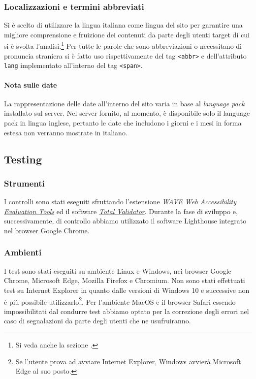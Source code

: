 \subsubsection{Localizzazioni e termini abbreviati} \label{lingue}
Si è scelto di utilizzare la lingua italiana come lingua del sito per garantire una migliore comprensione e fruizione dei contenuti da parte degli utenti target di cui si è svolta l’analisi.\footnote{Si veda anche la sezione \textit{.}}
Per tutte le parole che sono abbreviazioni o necessitano di pronuncia straniera si è fatto uso rispettivamente del tag \texttt{<abbr>} e dell'attributo \texttt{lang} implementato all’interno del tag \texttt{<span>}.

\paragraph{Nota sulle date} La rappresentazione delle date all'interno del sito varia in base al \textit{language pack} installato sul server. Nel server fornito, al momento, è disponibile solo il language pack in lingua inglese, pertanto le date che includono i giorni e i mesi in forma estesa non verranno mostrate in italiano.

\subsection{Testing}

\subsubsection{Strumenti}
I controlli sono stati eseguiti sfruttando l’estensione \href{https://wave.webaim.org/extension/}{\textit{WAVE Web Accessibility Evaluation Tools}} ed il software \href{https://www.totalvalidator.com/}{\textit{Total Validator}}. 
Durante la fase di sviluppo e, successivamente, di controllo abbiamo utilizzato il software Lighthouse integrato nel browser Google Chrome.

\subsubsection{Ambienti}
I test sono stati eseguiti su ambiente Linux e Windows, nei browser Google Chrome, Microsoft Edge, Mozilla Firefox e Chromium. Non sono stati effettuati test su Internet Explorer in quanto dalle versioni di Windows 10 e successive non è più possibile utilizzarlo\footnote{Se l’utente prova ad avviare Internet Explorer, Windows avvierà Microsoft Edge al suo posto.}. Per l’ambiente MacOS e il browser Safari essendo impossibilitati dal condurre test abbiamo optato per la correzione degli errori nel caso di segnalazioni da parte degli utenti che ne usufruiranno.

